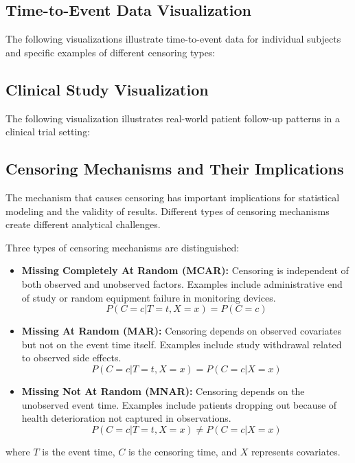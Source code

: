 \subsection{Time-to-Event Data Visualization}
\label{subsec:time-to-event}

The following visualizations illustrate time-to-event data for individual subjects and specific examples of different censoring types:



\subsection{Clinical Study Visualization}
\label{subsec:clinical-censoring}

The following visualization illustrates real-world patient follow-up patterns in a clinical trial setting:



\subsection{Censoring Mechanisms and Their Implications}
\label{subsec:censoring-mechanisms}

The mechanism that causes censoring has important implications for statistical modeling and the validity of results. Different types of censoring mechanisms create different analytical challenges.

\begin{definitionbox}[title=Censoring Mechanisms]
Three types of censoring mechanisms are distinguished:

\begin{itemize}
    \item \textbf{Missing Completely At Random (MCAR):} Censoring is independent of both observed and unobserved factors. Examples include administrative end of study or random equipment failure in monitoring devices.
    \begin{equation}
        P(C = c | T = t, X = x) = P(C = c)
    \end{equation}

    \item \textbf{Missing At Random (MAR):} Censoring depends on observed covariates but not on the event time itself. Examples include study withdrawal related to observed side effects.
    \begin{equation}
        P(C = c | T = t, X = x) = P(C = c | X = x)
    \end{equation}

    \item \textbf{Missing Not At Random (MNAR):} Censoring depends on the unobserved event time. Examples include patients dropping out because of health deterioration not captured in observations.
    \begin{equation}
        P(C = c | T = t, X = x) \neq P(C = c | X = x)
    \end{equation}
\end{itemize}

where $T$ is the event time, $C$ is the censoring time, and $X$ represents covariates.
\end{definitionbox}

